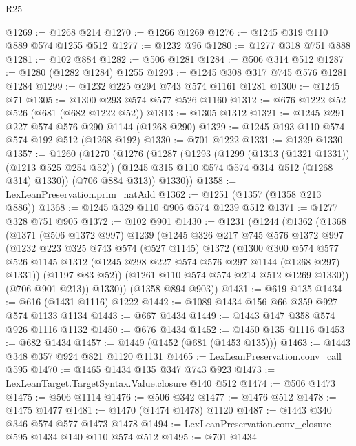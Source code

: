 \begin{lexlean}{R25}
\begin{coremodule}
@1269 := @1268 @214
@1270 := @1266 @1269
@1276 := @1245 @319 @110 @889 @574 @1255 @512
@1277 := @1232 @96
@1280 := @1277 @318 @751 @888
@1281 := @102 @884
@1282 := @506 @1281
@1284 := @506 @314 @512
@1287 := @1280 (@1282 @1284) @1255
@1293 := @1245 @308 @317 @745 @576 @1281 @1284
@1299 := @1232 @225 @294 @743 @574 @1161 @1281
@1300 := @1245 @71
@1305 := @1300 @293 @574 @577 @526 @1160
@1312 := @676 @1222 @52 @526 (@681 (@682 @1222 @52))
@1313 := @1305 @1312
@1321 := @1245 @291 @227 @574 @576 @290 @1144 (@1268 @290)
@1329 := @1245 @193 @110 @574 @574 @192 @512 (@1268 @192)
@1330 := @701 @1222
@1331 := @1329 @1330
@1357 := @1260
    (@1270
      (@1276
        (@1287
          (@1293
            (@1299 (@1313 (@1321 @1331)) (@1213 @525 @254 @52))
            (@1245 @315 @110 @574 @574 @314 @512 (@1268 @314) @1330))
          (@706 @884 @313))
        @1330))
@1358 := LexLeanPreservation.prim_natAdd
@1362 := @1251 (@1357 (@1358 @213 @886))
@1368 := @1245 @329 @110 @906 @574 @1239 @512
@1371 := @1277 @328 @751 @905
@1372 := @102 @901
@1430 := @1231
    (@1244
      (@1362
        (@1368
          (@1371
            (@506 @1372 @997)
            @1239
            (@1245
              @326
              @217
              @745
              @576
              @1372
              @997
              (@1232
                @223
                @325
                @743
                @574
                (@527 @1145)
                @1372
                (@1300
                  @300
                  @574
                  @577
                  @526
                  @1145
                  @1312
                  (@1245 @298 @227 @574 @576 @297 @1144 (@1268 @297) @1331))
                (@1197 @83 @52))
              (@1261 @110 @574 @574 @214 @512 @1269 @1330))
            (@706 @901 @213))
          @1330))
      (@1358 @894 @903))
@1431 := @619 @135
@1434 := @616 (@1431 @1116) @1222
@1442 := @1089 @1434 @156 @66 @359 @927 @574 @1133 @1134
@1443 := @667 @1434
@1449 := @1443 @147 @358 @574 @926 @1116 @1132
@1450 := @676 @1434
@1452 := @1450 @135 @1116
@1453 := @682 @1434
@1457 := @1449 (@1452 (@681 (@1453 @135)))
@1463 := @1443 @348 @357 @924 @821 @1120 @1131
@1465 := LexLeanPreservation.conv_call @595
@1470 := @1465 @1434 @135 @347 @743 @923
@1473 := LexLeanTarget.TargetSyntax.Value.closure @140 @512
@1474 := @506 @1473
@1475 := @506 @1114
@1476 := @506 @342
@1477 := @1476 @512
@1478 := @1475 @1477
@1481 := @1470 (@1474 @1478) @1120
@1487 := @1443 @340 @346 @574 @577 @1473 @1478
@1494 := LexLeanPreservation.conv_closure @595 @1434 @140 @110 @574 @512
@1495 := @701 @1434

\end{coremodule}
\end{lexlean}
